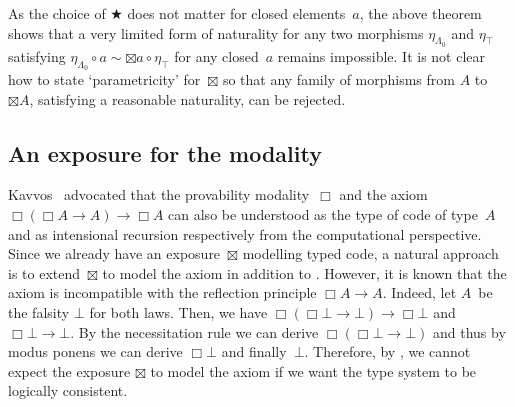 \documentclass[a4paper,UKenglish,numberwithinsect,cleveref,thm-restate]{lipics-v2021}
\numberwithin{equation}{section}
\theoremstyle{definition}
\theoremstyle{plain}
\begin{document}
%
As the choice of $\bigstar$ does not matter for closed elements~$a$, the above theorem shows that a very limited form of naturality for any two morphisms $\eta_{\Lambda_0}$ and $\eta_\top$ satisfying $\eta_{\Lambda_0} \circ a \sim \boxtimes{a} \circ \eta_{\top}$ for any closed~$a$ remains impossible. 
It is not clear how to state `parametricity' for~$\boxtimes$ so that any family of morphisms from $A$ to $\boxtimes A$, satisfying a reasonable naturality, can be rejected. 

\subsection{An exposure for the \texorpdfstring{\GL}{GL} modality}

Kavvos~\cite{Kavvos2017b} advocated that the provability modality~$\Box$ and the \GL axiom $\Box(\Box A \to A) \to \Box A$ can also be understood as the type of code of type~$A$ and as intensional recursion respectively from the computational perspective.
Since we already have an exposure~$\boxtimes$ modelling typed code, a natural approach is to extend~$\boxtimes$ to model the \GL axiom in addition to \SFour.
However, it is known that the \GL axiom is incompatible with the reflection principle $\Box A \to A$.
Indeed, let $A$~be the falsity $\bot$ for both laws.
Then, we have $\Box(\Box \bot \to \bot) \to \Box \bot$ and $\Box \bot \to \bot$.
By the necessitation rule we can derive $\Box (\Box \bot \to \bot)$ and thus by modus ponens we can derive $\Box \bot$ and finally~$\bot$.
Therefore, by , we cannot expect the exposure $\boxtimes$ to model the \GL axiom if we want the type system to be logically consistent.
\end{document}
